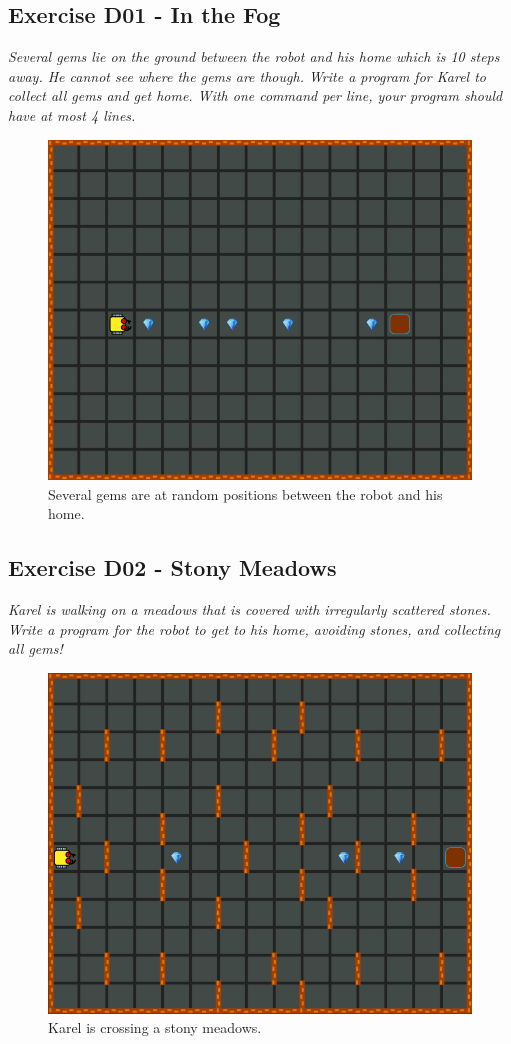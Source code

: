 {{{{\begin{enumerate}
\end{enumerate}

\newpage
\subsection{Exercise D01 - In the Fog}

{\em Several gems lie on the ground between the robot and his home which is 10 steps away. 
He cannot see where the gems are though. 
Write a program for Karel to collect all gems and get home. With one command per 
line, your program should have at most 4 lines.}\\[-7mm]


\begin{figure}[!ht]
\begin{center}
\includegraphics[height=0.4\textwidth]{imgk/d01.png}
\end{center}
\vspace{-4mm}
\caption{Several gems are at random positions between the robot and his home.}
\label{fig:d01}
\vspace{-4mm}
\end{figure}
\noindent

\subsection{Exercise D02 - Stony Meadows}

{\em Karel is walking on a meadows that is covered with irregularly 
scattered stones. Write a program for the robot to get to his home, 
avoiding stones, and collecting all gems!  }\\[-7mm]


\begin{figure}[!ht]
\begin{center}
\includegraphics[height=0.4\textwidth]{imgk/d02.png}
\end{center}
\vspace{-4mm}
\caption{Karel is crossing a stony meadows.}
\label{fig:d02}
\vspace{-10mm}
\end{figure}
\noindent

}}}}
